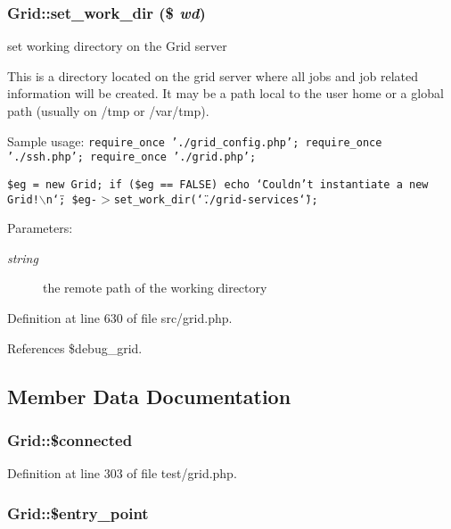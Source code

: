 \subsubsection{\setlength{\rightskip}{0pt plus 5cm}Grid::set\_\-work\_\-dir (\$ {\em wd})}\label{classGrid_a6}


set working directory on the Grid server 

This is a directory located on the grid server where all jobs and job related information will be created. It may be a path local to the user home or a global path (usually on /tmp or /var/tmp).

Sample usage: {\tt  require\_\-once './grid\_\-config.php'; require\_\-once './ssh.php'; require\_\-once './grid.php';}

{\tt  \$eg = new Grid; if (\$eg == FALSE) echo \char`\"{}Couldn't instantiate a new Grid!$\backslash$n\char`\"{}; \$eg-$>$set\_\-work\_\-dir(\char`\"{}./grid-services\char`\"{}); }

\begin{Desc}
\item[Parameters:]
\begin{description}
\item[{\em string}]the remote path of the working directory \end{description}
\end{Desc}


Definition at line 630 of file src/grid.php.

References \$debug\_\-grid.

\subsection{Member Data Documentation}
\subsubsection{\setlength{\rightskip}{0pt plus 5cm}Grid::\$connected}\label{classGrid_o10}




Definition at line 303 of file test/grid.php.
\subsubsection{\setlength{\rightskip}{0pt plus 5cm}Grid::\$entry\_\-point}\label{classGrid_o0}


